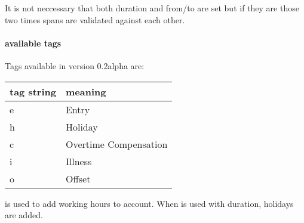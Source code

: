 \documentclass[letterpaper,10pt,english]{sphinxmanual}
\begin{document}
It is not neccessary that both duration and from/to are set but if they are those two times spans are validated against each other.


\paragraph{available tags}
\label{\detokenize{devmanual:available-tags}}
Tags available in version 0.2alpha are:


\begin{savenotes}\sphinxattablestart
\centering
\begin{tabulary}{\linewidth}[t]{|T|T|}
\hline
\sphinxstyletheadfamily 
tag string
&\sphinxstyletheadfamily 
meaning
\\
\hline
e
&
Entry
\\
\hline
h
&
Holiday
\\
\hline
c
&
Overtime Compensation
\\
\hline
i
&
Illness
\\
\hline
o
&
Offset
\\
\hline
\end{tabulary}
\par
\sphinxattableend\end{savenotes}

 is used to add working hours to account.
When  is used with duration, holidays are added.
\end{document}
